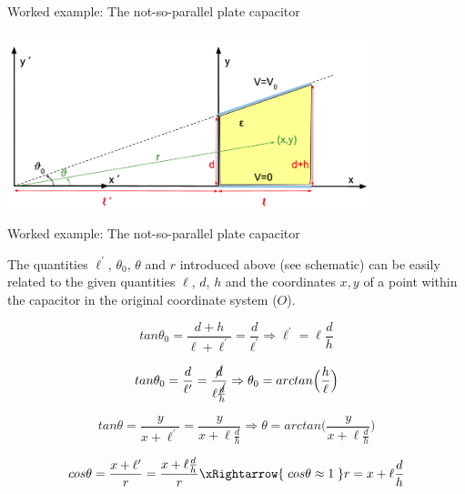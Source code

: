 {\begin{frame}{Worked example: The not-so-parallel plate capacitor}
\begin{center}
  \includegraphics[width=0.80\textwidth]{./images/problems/lect4_not_so_parallel_plane_capacitor_2.png}\\
\end{center}

\end{frame}


%
%
%

\begin{frame}{Worked example: The not-so-parallel plate capacitor}

The quantities $\ell^\prime$, $\theta_0$, $\theta$ and $r$ introduced above (see schematic)
can be easily related to the given quantities $\ell$, $d$, $h$ and the coordinates $x,y$
of a point within the capacitor in the original coordinate system ($O$).

  \begin{equation*}
    tan\theta_0 = \frac{d+h}{\ell+\ell^\prime} = \frac{d}{\ell^\prime} \Rightarrow
     \ell^\prime = \ell \frac{d}{h}
  \end{equation*}

  \begin{equation*}
    tan\theta_0 = \frac{d}{\ell^\prime} = \frac{\cancel{d}}{\ell \frac{\cancel{d}}{h}} \Rightarrow
    \theta_0 = arctan\Big(\frac{h}{\ell}\Big)
  \end{equation*}

  \begin{equation*}
    tan\theta = \frac{y}{x+\ell^\prime} = \frac{y}{x+\ell \frac{d}{h}} \Rightarrow
    \theta = arctan\Big(\frac{y}{x+\ell \frac{d}{h}}\Big)
  \end{equation*}

  \begin{equation*}
    cos\theta = \frac{x+\ell^\prime}{r} = \frac{x+\ell \frac{d}{h}}{r} \xRightarrow{\; cos\theta \approx 1 \;}
    r = x + \ell \frac{d}{h}
  \end{equation*}

\end{frame}

}
